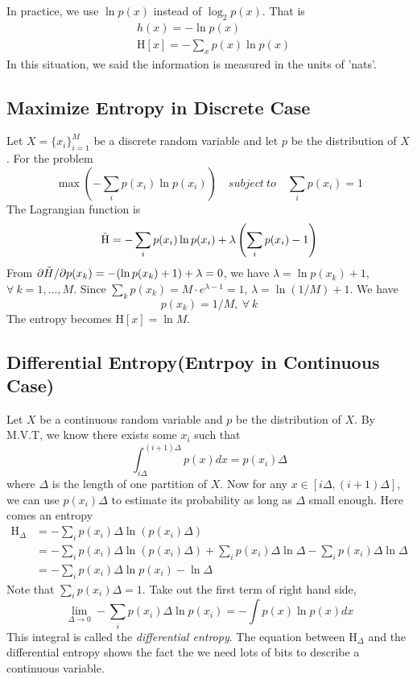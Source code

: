 \documentclass[../main.tex]{subfiles}
\begin{document}
            In practice, we use $\ln p(x)$ instead of $\log_2 p(x)$. That is
            \begin{align*}
                &h(x)=-\ln p(x)\\
                &\mathrm{H}[x] = -\sum_x p(x) \ln p(x)
            \end{align*}
            In this situation, we said the information is measured in the units of 'nats'.
        \subsection{Maximize Entropy in Discrete Case}
            Let $X=\{x_i\}_{i=1}^M$ be a discrete random variable and let $p$ be the distribution of $X$. For the problem
            \[
                \max \left(-\sum_i p(x_i)\ln p(x_i)\right) \quad subject~to \quad \sum_i p(x_i)=1
            \]
            The Lagrangian function is
            \[
                \Tilde{\mathrm{H}} = -\sum_i p(x_i)\ln p(x_i) + \lambda\left(\sum_i p(x_i) - 1\right)
            \]
            From $\partial\Tilde{H}/\partial p(x_k) = -(\ln p(x_k) + 1) + \lambda = 0$, we have $\lambda = \ln p(x_k) + 1$, $\forall~k=1,\dots,M$. Since $\sum_k p(x_k) = M\cdot e^{\lambda-1}=1$, $\lambda=\ln(1/M) + 1$. We have 
            \[
                p(x_k)=1/M,~\forall~k
            \]
            The entropy becomes $\mathrm{H}[x]=\ln M$.
            
        \subsection{Differential Entropy(Entrpoy in Continuous Case)}
            Let $X$ be a continuous random variable and $p$ be the distribution of $X$. By M.V.T, we know there exists some $x_i$ such that
            \[
                \int_{i\Delta}^{(i+1)\Delta}p(x)dx=p(x_i)\Delta
            \]
            where $\Delta$ is the length of one partition of $X$. Now for any $x\in[i\Delta,(i+1)\Delta]$, we can use $p(x_i)\Delta$ to estimate its probability as long as $\Delta$ small enough. Here comes an entropy
            \begin{align*}
                \mathrm{H}_{\Delta} &= -\sum_i p(x_i)\Delta\ln(p(x_i)\Delta)\\
                                    &= -\sum_i p(x_i)\Delta\ln(p(x_i)\Delta) + \sum_i p(x_i)\Delta\ln \Delta - \sum_i p(x_i)\Delta\ln \Delta\\
                                    &= -\sum_i p(x_i)\Delta\ln p(x_i) - \ln\Delta
            \end{align*}
            Note that $\sum_i p(x_i)\Delta=1$. Take out the first term of right hand side,
            \[
                \lim_{\Delta\rightarrow0}-\sum_i p(x_i)\Delta\ln p(x_i)= - \int p(x)\ln p(x)dx
            \]
            This integral is called the \textit{differential entropy}. The equation between $\mathrm{H}_\Delta$ and the differential entropy shows the fact the we need lots of bits to describe a continuous variable.
            
\end{document}
